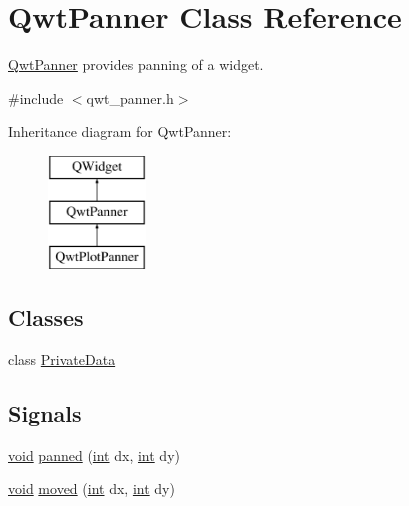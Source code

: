 \hypertarget{class_qwt_panner}{\section{Qwt\-Panner Class Reference}
\label{class_qwt_panner}
}


\hyperlink{class_qwt_panner}{Qwt\-Panner} provides panning of a widget.  




{\ttfamily \#include $<$qwt\-\_\-panner.\-h$>$}

Inheritance diagram for Qwt\-Panner\-:\begin{figure}[H]
\begin{center}
\leavevmode
\includegraphics[height=3.000000cm]{class_qwt_panner}
\end{center}
\end{figure}
\subsection*{Classes}
\begin{DoxyCompactItemize}
\item 
class \hyperlink{class_qwt_panner_1_1_private_data}{Private\-Data}
\end{DoxyCompactItemize}
\subsection*{Signals}
\begin{DoxyCompactItemize}
\item 
\hyperlink{group___u_a_v_objects_plugin_ga444cf2ff3f0ecbe028adce838d373f5c}{void} \hyperlink{class_qwt_panner_ae9ce78e6f9ae73317af29b2dc5df7372}{panned} (\hyperlink{ioapi_8h_a787fa3cf048117ba7123753c1e74fcd6}{int} dx, \hyperlink{ioapi_8h_a787fa3cf048117ba7123753c1e74fcd6}{int} dy)
\item 
\hyperlink{group___u_a_v_objects_plugin_ga444cf2ff3f0ecbe028adce838d373f5c}{void} \hyperlink{class_qwt_panner_aa45ae2f4d6d20a83783898dd86d0b595}{moved} (\hyperlink{ioapi_8h_a787fa3cf048117ba7123753c1e74fcd6}{int} dx, \hyperlink{ioapi_8h_a787fa3cf048117ba7123753c1e74fcd6}{int} dy)
\end{DoxyCompactItemize}
